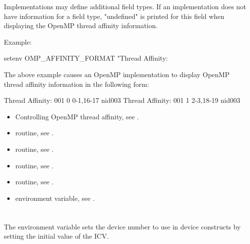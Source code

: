 \linenumbers


Implementations may define additional field types.  If an implementation does not have information
for a field type, "undefined" is printed for this field when displaying the OpenMP thread 
affinity information.



Example:
\begin{ompEnv}
setenv OMP_AFFINITY_FORMAT
       "Thread Affinity: %
\end{ompEnv}

The above example causes an OpenMP implementation to display OpenMP thread affinity information in the following form:
\begin{ompSyntax}
Thread Affinity: 001        0      0-1,16-17      nid003
Thread Affinity: 001        1      2-3,18-19      nid003
\end{ompSyntax}

\crossreferences
\begin{itemize}
\item Controlling OpenMP thread affinity, see
.
\item {} routine, see .
\item {} routine, see .
\item {} routine, see .
\item {} routine, see .
\item {} environment variable, see
.
\end{itemize}


\section{}
\label{sec:OMP_DEFAULT_DEVICE}
The  environment variable sets the device number to use in
device constructs by setting the initial value of the  ICV.

